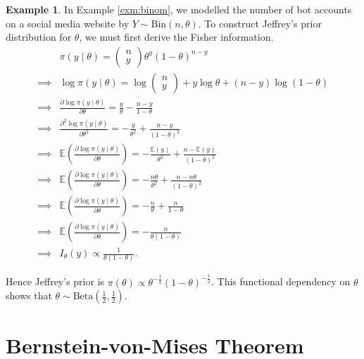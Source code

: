\documentclass[
]{book}
\theoremstyle{definition}
\theoremstyle{definition}
\newtheorem{example}{Example}[chapter]
\theoremstyle{definition}
\theoremstyle{definition}
\theoremstyle{remark}
\begin{document}
\begin{example}
In Example \ref{exm:binom}, we modelled the number of bot accounts on a social media website by \(Y \sim \textrm{Bin}(n, \theta)\). To construct Jeffrey's prior distribution for \(\theta\), we must first derive the Fisher information.\\
\begin{align*}
&\pi(y \mid \theta) = \begin{pmatrix} n \\ y \end{pmatrix} \theta^y (1-\theta)^{n-y}\\ 
\implies &\log \pi(y \mid \theta) = \log \begin{pmatrix} n \\ y \end{pmatrix} + y \log\theta + (n-y)\log(1-\theta) \\
\implies &\frac{\partial \log \pi(y \mid \theta)}{\partial \theta} = \frac{y}{\theta} - \frac{n-y}{1-\theta} \\
\implies &\frac{\partial^2 \log \pi(y \mid \theta)}{\partial \theta^2} = -\frac{y}{\theta^2} + \frac{n-y}{(1-\theta)^2} \\
\implies &\mathbb{E}\left(\frac{\partial \log \pi(y \mid \theta)}{\partial \theta}\right) = -\frac{\mathbb{E}(y)}{\theta^2} + \frac{n-\mathbb{E}(y)}{(1-\theta)^2}\\ 
\implies &\mathbb{E}\left(\frac{\partial \log \pi(y \mid \theta)}{\partial \theta}\right) = -\frac{n\theta}{\theta^2} + \frac{n-n\theta}{(1-\theta)^2}\\ 
\implies &\mathbb{E}\left(\frac{\partial \log \pi(y \mid \theta)}{\partial \theta}\right) = -\frac{n}{\theta} + \frac{n}{1-\theta}\\
\implies &\mathbb{E}\left(\frac{\partial \log \pi(y \mid \theta)}{\partial \theta}\right) = -\frac{n}{\theta(1-\theta)} \\
\implies &I_\theta(y) \propto \frac{1}{\theta(1-\theta)}.
\end{align*}

Hence Jeffrey's prior is \(\pi(\theta) \propto \theta^{-\frac{1}{2}}(1-\theta)^{-\frac{1}{2}}\). This functional dependency on \(\theta\) shows that \(\theta \sim \textrm{Beta}(\frac{1}{2}, \frac{1}{2})\).
\end{example}

\hypertarget{bernstein-von-mises-theorem}{%
\section{Bernstein-von-Mises Theorem}\label{bernstein-von-mises-theorem}}
\end{document}
